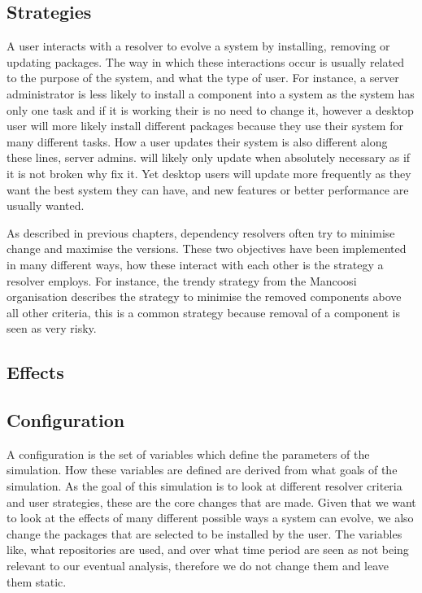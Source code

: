 \subsection{Strategies}
A user interacts with a resolver to evolve a system by installing, removing or updating packages.
The way in which these interactions occur is usually related to the purpose of the system, and what the type of user.
For instance, a server administrator is less likely to install a component into a system as the system has only one task and if it is working their is no need to change it, 
however a desktop user will more likely install different packages because they use their system for many different tasks.
How a user updates their system is also different along these lines, server admins. will likely only update when absolutely necessary as if it is not broken why fix it.
Yet desktop users will update more frequently as they want the best system they can have, and new features or better performance are usually wanted.

As described in previous chapters, dependency resolvers often try to minimise change and maximise the versions.
These two objectives have been implemented in many different ways, how these interact with each other is the strategy a resolver employs.
For instance, the trendy strategy from the Mancoosi organisation describes the strategy to minimise the removed components above all other criteria,
this is a common strategy because removal of a component is seen as very risky.

\subsection{Effects}






\subsection{Configuration}
A configuration is the set of variables which define the parameters of the simulation.
How these variables are defined are derived from what goals of the simulation.
As the goal of this simulation is to look at different resolver criteria and user strategies,
these are the core changes that are made.
Given that we want to look at the effects of many different possible ways a system can evolve,
we also change the packages that are selected to be installed by the user.
The variables like, what repositories are used, and over what time period are seen as not being relevant to our eventual analysis,
therefore we do not change them and leave them static.

